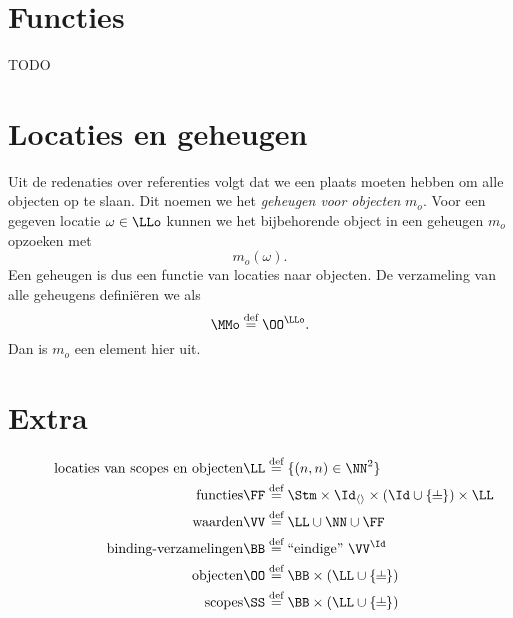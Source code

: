\section{Functies}
\label{model-functies}

TODO

\section{Locaties en geheugen}\label{sec:locaties}

Uit de redenaties over referenties volgt dat we een plaats moeten hebben om alle objecten op te slaan. Dit noemen we het \emph{geheugen voor objecten} $m_o$. Voor een gegeven locatie $\omega\in\LLo$ kunnen we het bijbehorende object in een geheugen $m_o$ opzoeken met
\begin{equation*}
  m_o(\omega).
\end{equation*}
Een geheugen is dus een functie van locaties naar objecten. De verzameling van alle geheugens definiëren we als
\begin{equation*}
  \MMo \DEF \OO^{\LLo}.
\end{equation*}
Dan is $m_o$ een element hier uit.

\section*{Extra}

\begin{align*}
  \tag*{locaties van scopes en objecten}
  \LL &\DEF \{ (n, n) \in \NN^2 \} \\
  \tag*{functies}
  \FF &\DEF \Stm \times \Id_{\langle\rangle} \times (\Id \cup \{\nil\}) \times \LL \\
  \tag*{waarden}
  \VV &\DEF \LL \cup \NN \cup \FF \\
  \tag*{binding-verzamelingen}
  \BB &\DEF \FiniteFunctions{\VV}{\Id} \\
  \tag*{objecten}
  \OO &\DEF \BB \times (\LL \cup \{\nil\}) \\
  \tag*{scopes}
  \SS &\DEF \BB \times (\LL \cup \{\nil\}) \\
\end{align*}

